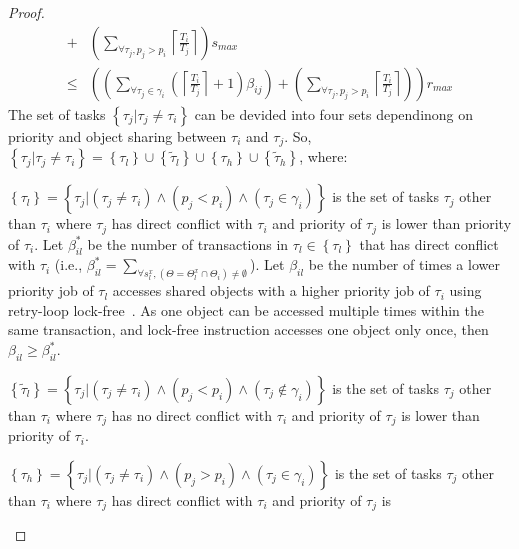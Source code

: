 \begin{proof}
\begin{eqnarray}
+ & \left(\sum_{\forall\tau_{j},p_{j}>p_{i}}\left\lceil \frac{T_{i}}{T_{j}}\right\rceil \right)s_{max}\nonumber \\
\le & \left(\left(\sum_{\forall\tau_{j}\in\gamma_{i}}\left(\left\lceil \frac{T_{i}}{T_{j}}\right\rceil +1\right)\beta_{ij}\right)+\left(\sum_{\forall\tau_{j},p_{j}>p_{i}}\left\lceil \frac{T_{i}}{T_{j}}\right\rceil \right)\right)r_{max}\label{eq:grma_lcm_vs_lf_4}
\end{eqnarray}
 The set of tasks $\left\{ \tau_{j}|\tau_{j}\neq\tau_{i}\right\} $
can be devided into four sets dependinong on priority and object sharing
between $\tau_{i}$ and $\tau_{j}$. So, $\left\{ \tau_{j}|\tau_{j}\neq\tau_{i}\right\} =\left\{ \tau_{l}\right\} \cup\left\{ \tilde{\tau}_{l}\right\} \cup\left\{ \tau_{h}\right\} \cup\left\{ \tilde{\tau}_{h}\right\} $,
where:
%
\begin{compactitem}
%
\item $\left\{ \tau_{l}\right\} =\left\{ \tau_{j}|\left(\tau_{j}\neq\tau_{i}\right)\wedge\left(p_{j}<p_{i}\right)\wedge\left(\tau_{j}\in\gamma_{i}\right)\right\} $
is the set of tasks $\tau_{j}$ other than $\tau_{i}$ where $\tau_{j}$
has direct conflict with $\tau_{i}$ and priority of $\tau_{j}$ is
lower than priority of $\tau_{i}$. Let $\beta_{il}^{*}$ be the number
of transactions in $\tau_{l}\in\left\{ \tau_{l}\right\} $ that has
direct conflict with $\tau_{i}$ (i.e., $\beta_{il}^{*}=\sum_{\forall s_{l}^{x},\left(\Theta=\Theta_{l}^{x}\cap\Theta_{i}\right)\neq\emptyset}$).
Let $\beta_{il}$ be the number of times a lower priority job of $\tau_{l}$
accesses shared objects with a higher priority job of $\tau_{i}$
using retry-loop lock-free~\cite{key-5}. As one object can be accessed
multiple times within the same transaction, and lock-free instruction
accesses one object only once, then $\beta_{il}\ge\beta_{il}^{*}$.
%
\item $\left\{ \tilde{\tau}_{l}\right\} =\left\{ \tau_{j}|\left(\tau_{j}\neq\tau_{i}\right)\wedge\left(p_{j}<p_{i}\right)\wedge\left(\tau_{j}\not\in\gamma_{i}\right)\right\} $
is the set of tasks $\tau_{j}$ other than $\tau_{i}$ where $\tau_{j}$
has no direct conflict with $\tau_{i}$ and priority of $\tau_{j}$
is lower than priority of $\tau_{i}$.
%
\item $\left\{ \tau_{h}\right\} =\left\{ \tau_{j}|\left(\tau_{j}\neq\tau_{i}\right)\wedge\left(p_{j}>p_{i}\right)\wedge\left(\tau_{j}\in\gamma_{i}\right)\right\} $
is the set of tasks $\tau_{j}$ other than $\tau_{i}$ where $\tau_{j}$
has direct conflict with $\tau_{i}$ and priority of $\tau_{j}$ is

\end{compactitem}
\end{proof}
